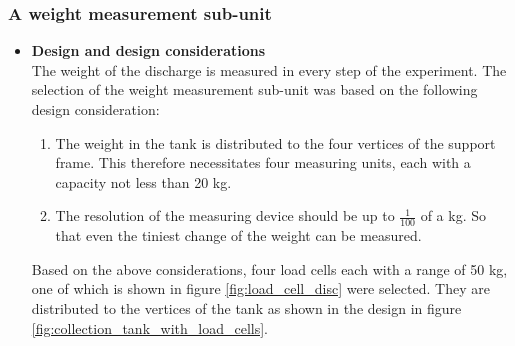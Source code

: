\subsubsection{A weight measurement sub-unit}
\begin{itemize}
\item \textbf{Design and design considerations}\\
The weight of the discharge is measured in every step of the experiment. The selection of the weight measurement sub-unit was based on the following design consideration:
\begin{enumerate}
    \item The weight in the tank is distributed to the four vertices of the support frame. This therefore necessitates four measuring units, each with a capacity not less than 20 kg.
    \item The resolution of the measuring device should be up to $\frac{1}{100}$ of a kg. So that even the tiniest change of the weight can be measured.
\end{enumerate}
Based on the above considerations, four load cells each with a range of 50 kg, one of which is shown in figure \ref{fig:load_cell_disc} were selected. They are distributed to the vertices of the tank as shown in the  design in figure \ref{fig:collection_tank_with_load_cells}.


\end{itemize}
